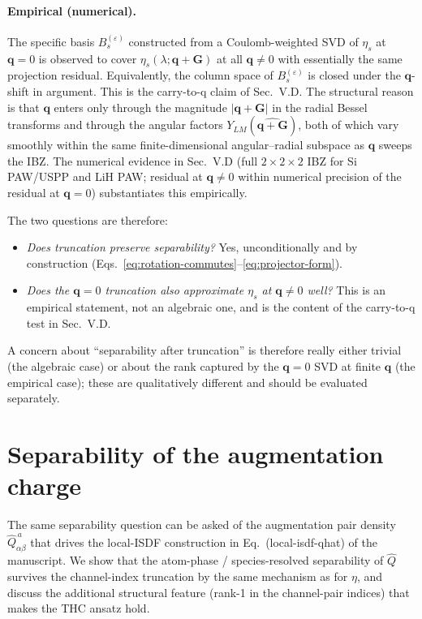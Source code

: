 \documentclass[aps,prb,reprint,superscriptaddress,nofootinbib]{revtex4-2}
\newcommand{\bG}{\mathbf G}
\newcommand{\bq}{\mathbf q}
\begin{document}
\paragraph{Empirical (numerical).}  The specific basis
\(B_s^{(\varepsilon)}\) constructed from a Coulomb-weighted SVD of
\(\eta_s\) at \(\bq=0\) is observed to cover \(\eta_s(\lambda;\bq+\bG)\)
at all \(\bq\neq 0\) with essentially the same projection residual.
Equivalently, the column space of \(B_s^{(\varepsilon)}\) is closed
under the \(\bq\)-shift in argument.  This is the carry-to-q claim of
Sec.~V.D.  The structural reason is that \(\bq\) enters only through
the magnitude \(|\bq+\bG|\) in the radial Bessel transforms and through
the angular factors \(Y_{LM}(\widehat{\bq+\bG})\), both of which vary
smoothly within the same finite-dimensional angular--radial subspace as
\(\bq\) sweeps the IBZ.  The numerical evidence in Sec.~V.D (full
\(2\times 2\times 2\) IBZ for Si PAW/USPP and LiH PAW; residual at
\(\bq\neq 0\) within numerical precision of the residual at \(\bq=0\))
substantiates this empirically.

The two questions are therefore:
\begin{itemize}
\item \emph{Does truncation preserve separability?}  Yes,
unconditionally and by construction
(Eqs.~\eqref{eq:rotation-commutes}--\eqref{eq:projector-form}).
\item \emph{Does the \(\bq=0\) truncation also approximate \(\eta_s\) at
\(\bq\neq 0\) well?}  This is an empirical statement, not an algebraic
one, and is the content of the carry-to-q test in Sec.~V.D.
\end{itemize}
A concern about ``separability after truncation'' is therefore really
either trivial (the algebraic case) or about the rank captured by the
\(\bq=0\) SVD at finite \(\bq\) (the empirical case); these are
qualitatively different and should be evaluated separately.

\section{Separability of the augmentation charge}
\label{sec:Qhat}

The same separability question can be asked of the augmentation pair
density \(\widehat Q^{\,a}_{\alpha\beta}\) that drives the local-ISDF
construction in Eq.~(local-isdf-qhat) of the manuscript.  We show that
the atom-phase / species-resolved separability of \(\widehat Q\)
survives the channel-index truncation by the same mechanism as for
\(\eta\), and discuss the additional structural feature
(rank-1 in the channel-pair indices) that makes the THC ansatz hold.
\end{document}
